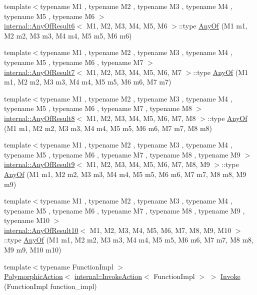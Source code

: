 \begin{DoxyCompactItemize}
\item 
{\footnotesize template$<$typename M1 , typename M2 , typename M3 , typename M4 , typename M5 , typename M6 $>$ }\\\mbox{\hyperlink{structtesting_1_1internal_1_1AnyOfResult6}{internal\+::\+Any\+Of\+Result6}}$<$ M1, M2, M3, M4, M5, M6 $>$\+::type \mbox{\hyperlink{namespacetesting_a747189264a49a426004366371f1a2575}{Any\+Of}} (M1 m1, M2 m2, M3 m3, M4 m4, M5 m5, M6 m6)
\item 
{\footnotesize template$<$typename M1 , typename M2 , typename M3 , typename M4 , typename M5 , typename M6 , typename M7 $>$ }\\\mbox{\hyperlink{structtesting_1_1internal_1_1AnyOfResult7}{internal\+::\+Any\+Of\+Result7}}$<$ M1, M2, M3, M4, M5, M6, M7 $>$\+::type \mbox{\hyperlink{namespacetesting_a754d1bddb237e79613f6834af3329efa}{Any\+Of}} (M1 m1, M2 m2, M3 m3, M4 m4, M5 m5, M6 m6, M7 m7)
\item 
{\footnotesize template$<$typename M1 , typename M2 , typename M3 , typename M4 , typename M5 , typename M6 , typename M7 , typename M8 $>$ }\\\mbox{\hyperlink{structtesting_1_1internal_1_1AnyOfResult8}{internal\+::\+Any\+Of\+Result8}}$<$ M1, M2, M3, M4, M5, M6, M7, M8 $>$\+::type \mbox{\hyperlink{namespacetesting_a9c979c62cc004664b14e0ce444e531d5}{Any\+Of}} (M1 m1, M2 m2, M3 m3, M4 m4, M5 m5, M6 m6, M7 m7, M8 m8)
\item 
{\footnotesize template$<$typename M1 , typename M2 , typename M3 , typename M4 , typename M5 , typename M6 , typename M7 , typename M8 , typename M9 $>$ }\\\mbox{\hyperlink{structtesting_1_1internal_1_1AnyOfResult9}{internal\+::\+Any\+Of\+Result9}}$<$ M1, M2, M3, M4, M5, M6, M7, M8, M9 $>$\+::type \mbox{\hyperlink{namespacetesting_a873c812db953aebd4bf2ffbff0e8d770}{Any\+Of}} (M1 m1, M2 m2, M3 m3, M4 m4, M5 m5, M6 m6, M7 m7, M8 m8, M9 m9)
\item 
{\footnotesize template$<$typename M1 , typename M2 , typename M3 , typename M4 , typename M5 , typename M6 , typename M7 , typename M8 , typename M9 , typename M10 $>$ }\\\mbox{\hyperlink{structtesting_1_1internal_1_1AnyOfResult10}{internal\+::\+Any\+Of\+Result10}}$<$ M1, M2, M3, M4, M5, M6, M7, M8, M9, M10 $>$\+::type \mbox{\hyperlink{namespacetesting_a1797921d3ed04c7f13dfa8f36bf0bf1c}{Any\+Of}} (M1 m1, M2 m2, M3 m3, M4 m4, M5 m5, M6 m6, M7 m7, M8 m8, M9 m9, M10 m10)
\item 
{\footnotesize template$<$typename Function\+Impl $>$ }\\\mbox{\hyperlink{classtesting_1_1PolymorphicAction}{Polymorphic\+Action}}$<$ \mbox{\hyperlink{classtesting_1_1internal_1_1InvokeAction}{internal\+::\+Invoke\+Action}}$<$ Function\+Impl $>$ $>$ \mbox{\hyperlink{namespacetesting_a12aebaf8363d49a383047529f798b694}{Invoke}} (Function\+Impl function\+\_\+impl)

\end{DoxyCompactItemize}
